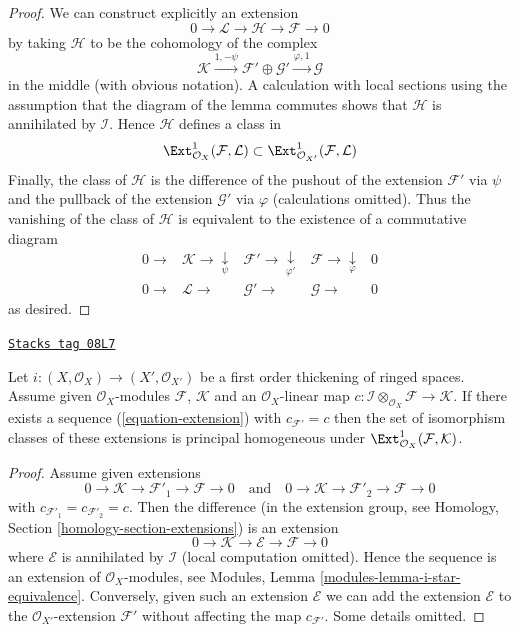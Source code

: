 \begin{proof}
We can construct explicitly an extension
$$
0 \to \mathcal{L} \to \mathcal{H} \to \mathcal{F} \to 0
$$
by taking $\mathcal{H}$ to be the cohomology of the complex
$$
\mathcal{K}
\xrightarrow{1, - \psi}
\mathcal{F}' \oplus \mathcal{G}' \xrightarrow{\varphi, 1}
\mathcal{G}
$$
in the middle (with obvious notation). A calculation with local sections
using the assumption that the diagram of the lemma commutes
shows that $\mathcal{H}$ is annihilated by $\mathcal{I}$. Hence
$\mathcal{H}$ defines a class in
$$
\Ext^1_{\mathcal{O}_X}(\mathcal{F}, \mathcal{L})
\subset
\Ext^1_{\mathcal{O}_{X'}}(\mathcal{F}, \mathcal{L})
$$
Finally, the class of $\mathcal{H}$ is the difference of the pushout
of the extension $\mathcal{F}'$ via $\psi$ and the pullback
of the extension $\mathcal{G}'$ via $\varphi$ (calculations omitted).
Thus the vanishing of the class of $\mathcal{H}$ is equivalent to the
existence of a commutative diagram
$$
\begin{array}{ccccc}0 \longrightarrow & \mathcal{K} \longrightarrow\underset{\psi}{\downarrow} & \mathcal{F}' \longrightarrow\underset{\varphi'}{\downarrow} & \mathcal{F} \longrightarrow\underset{\varphi}{\downarrow} & 0 \\ 0 \longrightarrow & \mathcal{L} \longrightarrow & \mathcal{G}' \longrightarrow & \mathcal{G} \longrightarrow & 0\end{array}
$$
as desired.
\end{proof}

\begin{lemma}
\label{defos-lemma-inf-ext}
\href{https://stacks.math.columbia.edu/tag/08L7}{\texttt{Stacks tag 08L7}}

Let $i : (X, \mathcal{O}_X) \to (X', \mathcal{O}_{X'})$ be a first order
thickening of ringed spaces.
Assume given $\mathcal{O}_X$-modules $\mathcal{F}$, $\mathcal{K}$
and an $\mathcal{O}_X$-linear map
$c : \mathcal{I} \otimes_{\mathcal{O}_X} \mathcal{F} \to \mathcal{K}$.
If there exists a sequence (\ref{equation-extension}) with
$c_{\mathcal{F}'} = c$ then the set of isomorphism classes of these
extensions is principal homogeneous under
$\Ext^1_{\mathcal{O}_X}(\mathcal{F}, \mathcal{K})$.
\end{lemma}

\begin{proof}
Assume given extensions
$$
0 \to \mathcal{K} \to \mathcal{F}'_1 \to \mathcal{F} \to 0
\quad\text{and}\quad
0 \to \mathcal{K} \to \mathcal{F}'_2 \to \mathcal{F} \to 0
$$
with $c_{\mathcal{F}'_1} = c_{\mathcal{F}'_2} = c$. Then the difference
(in the extension group, see
Homology, Section \ref{homology-section-extensions})
is an extension
$$
0 \to \mathcal{K} \to \mathcal{E} \to \mathcal{F} \to 0
$$
where $\mathcal{E}$ is annihilated by $\mathcal{I}$ (local computation
omitted). Hence the sequence is an extension of $\mathcal{O}_X$-modules,
see Modules, Lemma \ref{modules-lemma-i-star-equivalence}.
Conversely, given such an extension $\mathcal{E}$ we can add the extension
$\mathcal{E}$ to the $\mathcal{O}_{X'}$-extension $\mathcal{F}'$ without
affecting the map $c_{\mathcal{F}'}$. Some details omitted.
\end{proof}

